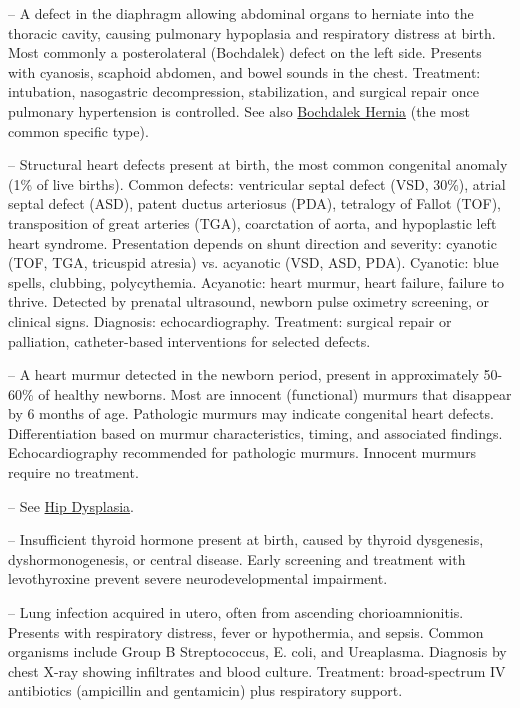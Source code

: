 -- A defect in the diaphragm allowing abdominal organs to herniate into the thoracic cavity, causing pulmonary hypoplasia and respiratory distress at birth. Most commonly a posterolateral (Bochdalek) defect on the left side. Presents with cyanosis, scaphoid abdomen, and bowel sounds in the chest. Treatment: intubation, nasogastric decompression, stabilization, and surgical repair once pulmonary hypertension is controlled. See also \hyperlink{Bochdalek Hernia}{Bochdalek Hernia} (the most common specific type).

-- Structural heart defects present at birth, the most common congenital anomaly (1\% of live births). Common defects: ventricular septal defect (VSD, 30\%), atrial septal defect (ASD), patent ductus arteriosus (PDA), tetralogy of Fallot (TOF), transposition of great arteries (TGA), coarctation of aorta, and hypoplastic left heart syndrome. Presentation depends on shunt direction and severity: cyanotic (TOF, TGA, tricuspid atresia) vs. acyanotic (VSD, ASD, PDA). Cyanotic: blue spells, clubbing, polycythemia. Acyanotic: heart murmur, heart failure, failure to thrive. Detected by prenatal ultrasound, newborn pulse oximetry screening, or clinical signs. Diagnosis: echocardiography. Treatment: surgical repair or palliation, catheter-based interventions for selected defects.

-- A heart murmur detected in the newborn period, present in approximately 50-60\% of healthy newborns. Most are innocent (functional) murmurs that disappear by 6 months of age. Pathologic murmurs may indicate congenital heart defects. Differentiation based on murmur characteristics, timing, and associated findings. Echocardiography recommended for pathologic murmurs. Innocent murmurs require no treatment.

-- See \hyperlink{Hip Dysplasia}{Hip Dysplasia}.

-- Insufficient thyroid hormone present at birth, caused by thyroid dysgenesis, dyshormonogenesis, or central disease. Early screening and treatment with levothyroxine prevent severe neurodevelopmental impairment.

-- Lung infection acquired in utero, often from ascending chorioamnionitis. Presents with respiratory distress, fever or hypothermia, and sepsis. Common organisms include Group B Streptococcus, E. coli, and Ureaplasma. Diagnosis by chest X-ray showing infiltrates and blood culture. Treatment: broad-spectrum IV antibiotics (ampicillin and gentamicin) plus respiratory support.

